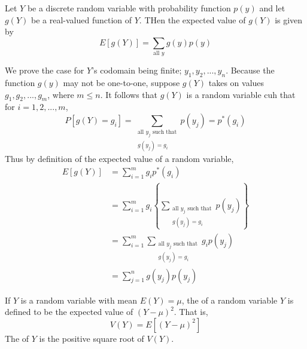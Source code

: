 \documentclass[12pt, a4paper, twoside, openright, titlepage]{book}
\begin{document}
\begin{thm}{}{}
    Let $Y$ be a discrete random variable with probability function $p(y)$ and let $g(Y)$ be a real-valued function of $Y$. THen the expected value of $g(Y)$ is given by \begin{equation*}
        E[g(Y)] = \sum\limits_{\text{all }y}g(y)p(y)
    \end{equation*}
\end{thm}
\begin{proof*}{}{}
    We prove the case for $Y$'s codomain being finite; $y_1,y_2,...,y_n$. Because the function $g(y)$ may not be one-to-one, suppose $g(Y)$ takes on values $g_1,g_2,...,g_m$, where $m \leq n$. It follows that $g(Y)$ is a random variable cuh that for $i = 1,2,...,m$, \begin{equation*}
        P[g(Y)=g_i] = \sum\limits_{\begin{array}{c} \text{all } y_j\text{ such that} \\ g(y_j) = g_i\end{array}}p(y_j) = p^*(g_i)
    \end{equation*}
    Thus by definition of the expected value of a random variable, \begin{align*}
        E[g(Y)] &= \sum\limits_{i=1}^mg_ip^*(g_i) \\
        &= \sum\limits_{i=1}^mg_i\left\{\sum\limits_{\begin{array}{c} \text{all } y_j\text{ such that} \\ g(y_j) = g_i\end{array}}p(y_j)\right\} \\
        &= \sum\limits_{i=1}^m\sum\limits_{\begin{array}{c} \text{all } y_j\text{ such that} \\ g(y_j) = g_i\end{array}}g_ip(y_j) \\
            &= \sum\limits_{j=1}^ng(y_j)p(y_j)
    \end{align*}
\end{proof*}

\begin{defn}{}{}
    If $Y$ is a random variable with mean $E(Y) = \mu$, the  of a random variable $Y$ is defined to be the expected value of $(Y-\mu)^2$. That is, \begin{equation*}
        V(Y) = E[(Y-\mu)^2]
    \end{equation*}
    The  of $Y$ is the positive square root of $V(Y)$.
\end{defn}
\end{document}

